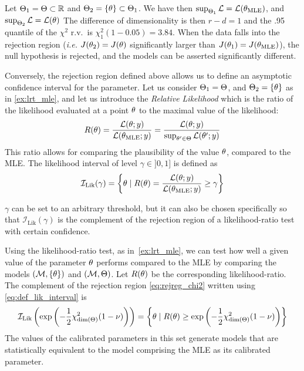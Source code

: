 \documentclass[../../Main_ManuscritThese.tex]{subfiles}
\begin{document}
\begin{example}
  \label{ex:lrt_mle}
  Let $\Theta_1 = \Theta\subset \mathbb{R}$ and
  $\Theta_2 = \{\theta\}\subset \Theta_1$.  We have then
  $\sup_{\Theta_1} \mathcal{L} = \mathcal{L}({\theta}_{\mathrm{MLE}})$,
  and $\sup_{\Theta_2} \mathcal{L} = \mathcal{L}(\theta)$ The difference
  of dimensionality is then $r-d=1$ and the .95 quantile of the
  $\chi^2$ r.v.\ is $\chi^2_1(1-0.05) =3.84$. When the data falls into
  the rejection region (\emph{i.e.} $J(\theta_2)=J(\theta)$ significantly larger
  than $J({\theta}_1)=J(\theta_{\mathrm{MLE}})$), the null hypothesis is rejected, and the models
  can be asserted significantly different.
\end{example}



\label{sec:relative_likelihood}
Conversely, the rejection region defined above allows us to define an asymptotic confidence interval for the parameter. Let us consider $\Theta_1 = \Theta$, and $\Theta_2 = \{\theta\}$ as in \cref{ex:lrt_mle}, and let us introduce the \emph{Relative Likelihood} \citep{kalbfleisch_probability_1985} which is the ratio of the likelihood evaluated at a point $\theta$ to the maximal value of the likelihood:
\begin{equation}
  R(\theta) = \frac{\mathcal{L}(\theta;y)}{\mathcal{L}({\theta}_{\mathrm{MLE}};y)} = \frac{\mathcal{L}(\theta;y)}{\sup_{\theta^{\prime} \in \Theta}\mathcal{L}(\theta^{\prime};y)}
\end{equation}
This ratio allows for comparing the plausibility of the value $\theta$, compared to the MLE.
The likelihood interval of level $\gamma\in ]0,1]$ is defined as
\begin{equation}
  \label{eq:def_lik_interval}
  \mathcal{I}_{\mathrm{Lik}}(\gamma) = \left\{\theta \mid R(\theta)=\frac{\mathcal{L}(\theta;y)}{\mathcal{L}({\theta}_{\mathrm{MLE}};y)} \geq \gamma\right\}
\end{equation}

$\gamma$ can be set to an arbitrary threshold, but it can also be chosen
specifically so that $\mathcal{I}_{\mathrm{Lik}}(\gamma)$ is the complement
of the rejection region of a likelihood-ratio test with certain
confidence.

Using the likelihood-ratio test, as in~\cref{ex:lrt_mle}, we can test
how well a given value of the parameter $\theta$ performs compared to the
MLE by comparing the models $(\mathcal{M}, \{\theta\})$ and
$(\mathcal{M},\Theta)$. Let $R(\theta)$ be the corresponding
likelihood-ratio. The complement of the rejection region
\cref{eq:rejreg_chi2} written using \cref{eq:def_lik_interval} is
\begin{equation}
  \label{eq:rel_lik_threshold}
  \mathcal{I}_{\mathrm{Lik}}\left(\exp\left(-\frac{1}{2}\chi^2_{\mathrm{dim}(\Theta)}(1-\nu)\right)\right) = \left\{\theta \mid R(\theta) \geq \exp\left(-\frac{1}{2}\chi^2_{\mathrm{dim}(\Theta)}(1-\nu)\right) \right\}
\end{equation}
The values of the calibrated parameters in this set generate models
that are statistically equivalent to the model comprising the MLE as
its calibrated parameter.
\end{document}
